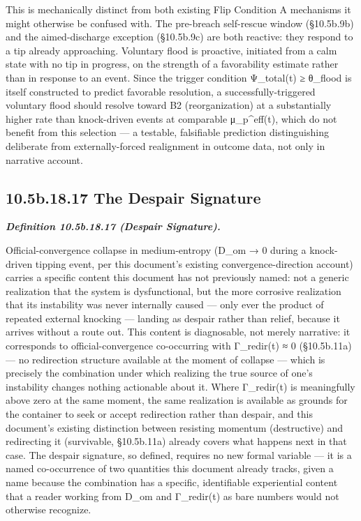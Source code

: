 \documentclass[
]{article}
\begin{document}
This is mechanically distinct from both existing Flip Condition A
mechanisms it might otherwise be confused with. The pre-breach
self-rescue window (§10.5b.9b) and the aimed-discharge exception
(§10.5b.9c) are both reactive: they respond to a tip already
approaching. Voluntary flood is proactive, initiated from a calm state
with no tip in progress, on the strength of a favorability estimate
rather than in response to an event. Since the trigger condition
Ψ\_total(t) ≥ θ\_flood is itself constructed to predict favorable
resolution, a successfully-triggered voluntary flood should resolve
toward B2 (reorganization) at a substantially higher rate than
knock-driven events at comparable μ\_p\^{}eff(t), which do not benefit
from this selection --- a testable, falsifiable prediction
distinguishing deliberate from externally-forced realignment in outcome
data, not only in narrative account.

\hypertarget{b.18.17-the-despair-signature}{%
\subsection{10.5b.18.17 The Despair
Signature}\label{b.18.17-the-despair-signature}}

\emph{\textbf{Definition 10.5b.18.17 (Despair Signature).}}

Official-convergence collapse in medium-entropy (D\_om → 0 during a
knock-driven tipping event, per this document's existing
convergence-direction account) carries a specific content this document
has not previously named: not a generic realization that the system is
dysfunctional, but the more corrosive realization that its instability
was never internally caused --- only ever the product of repeated
external knocking --- landing as despair rather than relief, because it
arrives without a route out. This content is diagnosable, not merely
narrative: it corresponds to official-convergence co-occurring with
Γ\_redir(t) ≈ 0 (§10.5b.11a) --- no redirection structure available at
the moment of collapse --- which is precisely the combination under
which realizing the true source of one's instability changes nothing
actionable about it. Where Γ\_redir(t) is meaningfully above zero at the
same moment, the same realization is available as grounds for the
container to seek or accept redirection rather than despair, and this
document's existing distinction between resisting momentum (destructive)
and redirecting it (survivable, §10.5b.11a) already covers what happens
next in that case. The despair signature, so defined, requires no new
formal variable --- it is a named co-occurrence of two quantities this
document already tracks, given a name because the combination has a
specific, identifiable experiential content that a reader working from
D\_om and Γ\_redir(t) as bare numbers would not otherwise recognize.
\end{document}
